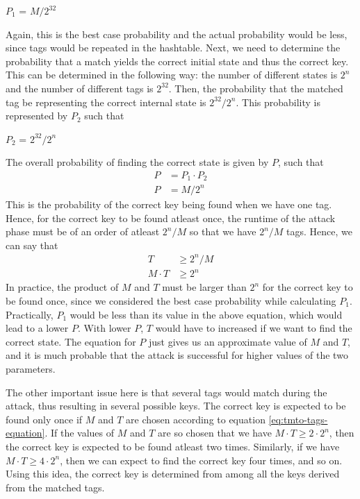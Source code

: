 \begin{center}
$P_1$ = $M/2^{32}$
\end{center}

Again, this is the best case probability and the actual probability would be less, since tags would be repeated in the hashtable. Next, we need to determine the probability that a match yields the correct initial state and thus the correct key. This can be determined in the following way: the number of different states is $2^n$ and the number of different tags is $2^{32}$. Then, the probability that the matched tag be representing the correct internal state is $2^{32}/2^n$. This probability is represented by $P_2$ such that
\begin{center}
$P_2$ = $2^{32}/2^n$
\end{center}
The overall probability of finding the correct state is given by $P$, such that
\begin{align*}
P &= P_1 \cdot P_2\\
P &= M/2^{n}
\end{align*}
This is the probability of the correct key being found when we have one tag. Hence, for the correct key to be found atleast once, the runtime of the attack phase must be of an order of atleast $2^{n}/M$ so that we have $2^{n}/M$ tags. Hence, we can say that
\begin{align}
T &\geq 2^{n}/M\\
\label{eq:tmto-tags-equation} M \cdot T &\geq 2^{n}
\end{align}
In practice, the product of $M$ and $T$ must be larger than $2^n$ for the correct key to be found once, since we considered the best case probability while calculating $P_1$. Practically, $P_1$ would be less than its value in the above equation, which would lead to a lower $P$. With lower $P$, $T$ would have to increased if we want to find the correct state. The equation for $P$ just gives us an approximate value of $M$ and $T$, and it is much probable that the attack is successful for higher values of the two parameters.

The other important issue here is that several tags would match during the attack, thus resulting in several possible keys. The correct key is expected to be found only once if $M$ and $T$ are chosen according to equation \ref{eq:tmto-tags-equation}. If the values of $M$ and $T$ are so chosen that we have $M \cdot T \geq 2 \cdot 2^{n}$, then the correct key is expected to be found atleast two times. Similarly, if we have $M \cdot T \geq 4 \cdot 2^{n}$, then we can expect to find the correct key four times, and so on. Using this idea, the correct key is determined from among all the keys derived from the matched tags. 

